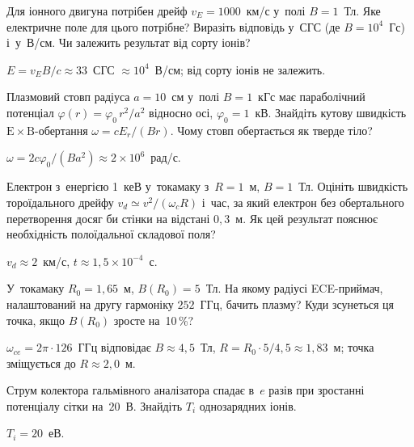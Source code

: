 \begin{problem}\label{prb:IonThruster}
	Для іонного двигуна потрібен дрейф $v_E=1000$~км/с у~полі $B=1$~Тл. Яке електричне поле
	для цього потрібне? Виразіть відповідь у~СГС (де $B=10^4$~Гс) і~у~В/см. Чи залежить результат від сорту іонів?
	\begin{solution}
		$E=v_EB/c\approx33$~СГС $\approx10^4$~В/см; від сорту іонів не залежить.
	\end{solution}
\end{problem}

\begin{problem}\label{prb:ExBRotation}
	Плазмовий стовп радіуса $a=10$~см у~полі $B=1$~кГс має параболічний потенціал
	$\varphi(r)=\varphi_0\,r^2/a^2$ відносно осі, $\varphi_0=1$~кВ. Знайдіть кутову швидкість
	$\mathrm E\times\mathrm B$-обертання $\omega=cE_r/(Br)$. Чому стовп обертається як тверде тіло?
	\begin{solution}
		$\omega=2c\varphi_0/(Ba^2)\approx2\times10^6$~рад/с.
	\end{solution}
\end{problem}

\begin{problem}\label{prb:ToroidalDriftEstimate}
	Електрон з~енергією 1~кеВ у~токамаку з~$R=1$~м, $B=1$~Тл. Оцініть швидкість тороїдального
	дрейфу $v_d\simeq v^2/(\omega_c R)$ і~час, за який електрон без обертального перетворення
	досяг би стінки на відстані $0{,}3$~м. Як цей результат пояснює необхідність
	полоїдальної складової поля?
	\begin{solution}
		$v_d\approx2$~км/с, $t\approx1{,}5\times10^{-4}$~с.
	\end{solution}
\end{problem}

\begin{problem}\label{prb:ECERadius}
	У~токамаку $R_0=1{,}65$~м, $B(R_0)=5$~Тл. На якому радіусі ECE-приймач, налаштований на другу гармоніку
	$252$~ГГц, бачить плазму? Куди зсунеться ця точка, якщо $B(R_0)$ зросте на~10\,\%?
	\begin{solution}
		$\omega_{ce}=2\pi\cdot126$~ГГц відповідає $B\approx4{,}5$~Тл, $R=R_0\cdot5/4{,}5\approx1{,}83$~м; точка зміщується до $R\approx2{,}0$~м.
	\end{solution}
\end{problem}

\begin{problem}\label{prb:RetardingAnalyzer}
	Струм колектора гальмівного аналізатора спадає в~$e$ разів при зростанні потенціалу сітки на~$20$~В. Знайдіть $T_i$ однозарядних іонів.
	\begin{solution}
		$T_i=20$~еВ.
	\end{solution}
\end{problem}

